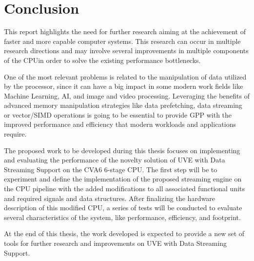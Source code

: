 \chapter{Conclusion}
This report highlights the need for further research aiming at the achievement of faster and more capable computer systems. This research can occur in multiple research directions and may involve several improvements in multiple components of the \acrshort{CPU}in order to solve the existing performance bottlenecks.

One of the most relevant problems is related to the manipulation of data utilized by the processor, since it can have a big impact in some modern work fields like Machine Learning, AI, and image and video processing. Leveraging the benefits of advanced memory manipulation strategies like data prefetching, data streaming or vector/SIMD operations is going to be essential to provide \acrfull{GPP} with the improved performance and efficiency that modern workloads and applications require.

The proposed work to be developed during this thesis focuses on implementing and evaluating the performance of the novelty solution of UVE with Data Streaming Support on the CVA6 6-stage CPU. The first step will be to experiment and define the implementation of the proposed streaming engine on the CPU pipeline with the added modifications to all associated functional units and required signals and data structures. After finalizing the hardware description of this modified CPU, a series of tests will be conducted to evaluate several characteristics of the system, like performance, efficiency, and footprint. 

At the end of this thesis, the work developed is expected to provide a new set of tools for further research and improvements on UVE with Data Streaming Support.








